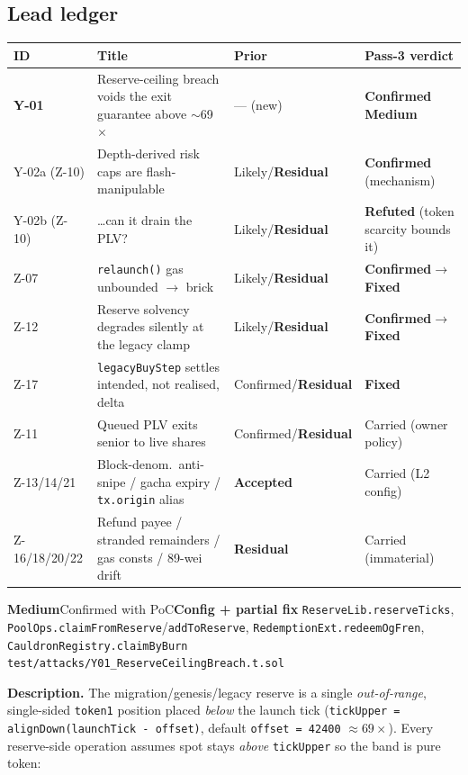 \documentclass[10pt,a4paper]{article}
\newcommand{\sev}[2]{\textcolor{#1}{\textbf{#2}}}
\newcommand{\SevMed}{\sev{med}{Medium}}
\newcommand{\Fixed}{\textcolor{ok}{\textbf{Fixed}}}
\newcommand{\Residual}{\textcolor{med}{\textbf{Residual}}}
\newcommand{\Accepted}{\textcolor{info}{\textbf{Accepted}}}
\newcommand{\Confirmed}{\textcolor{high}{\textbf{Confirmed}}}
\newcommand{\Refuted}{\textcolor{ok}{\textbf{Refuted}}}
\newcommand{\code}[1]{\texttt{\small #1}}
\begin{document}
\subsection{Lead ledger}
\begin{center}\small
\begin{tabular}{@{}llll@{}}
\toprule
\textbf{ID} & \textbf{Title} & \textbf{Prior} & \textbf{Pass-3 verdict} \\
\midrule
\textbf{Y-01} & Reserve-ceiling breach voids the exit guarantee above $\sim$69$\times$ & --- (new) & \Confirmed{} \SevMed \\
Y-02a (Z-10) & Depth-derived risk caps are flash-manipulable & Likely/\Residual & \Confirmed{} (mechanism) \\
Y-02b (Z-10) & \ldots{}can it drain the PLV? & Likely/\Residual & \Refuted{} (token scarcity bounds it) \\
Z-07 & \code{relaunch()} gas unbounded $\to$ brick & Likely/\Residual & \Confirmed$\to$\Fixed \\
Z-12 & Reserve solvency degrades silently at the legacy clamp & Likely/\Residual & \Confirmed$\to$\Fixed \\
Z-17 & \code{legacyBuyStep} settles intended, not realised, delta & Confirmed/\Residual & \Fixed \\
Z-11 & Queued PLV exits senior to live shares & Confirmed/\Residual & Carried (owner policy) \\
Z-13/14/21 & Block-denom.\ anti-snipe / gacha expiry / \code{tx.origin} alias & \Accepted & Carried (L2 config) \\
Z-16/18/20/22 & Refund payee / stranded remainders / gas consts / 89-wei drift & \Residual & Carried (immaterial) \\
\bottomrule
\end{tabular}
\end{center}

{\SevMed}{Confirmed with PoC}{\textcolor{med}{\textbf{Config + partial fix}}}
{\code{ReserveLib.reserveTicks}, \code{PoolOps.claimFromReserve}/\code{addToReserve}, \code{RedemptionExt.redeemOgFren}, \code{CauldronRegistry.claimByBurn}}
{\code{test/attacks/Y01\_ReserveCeilingBreach.t.sol}}

\textbf{Description.} The migration/genesis/legacy reserve is a single
\emph{out-of-range}, single-sided \code{token1} position placed \emph{below} the
launch tick (\code{tickUpper = alignDown(launchTick - offset)}, default
\code{offset = 42400} $\approx 69\times$). Every reserve-side operation assumes spot
stays \emph{above} \code{tickUpper} so the band is pure token:
\end{document}
